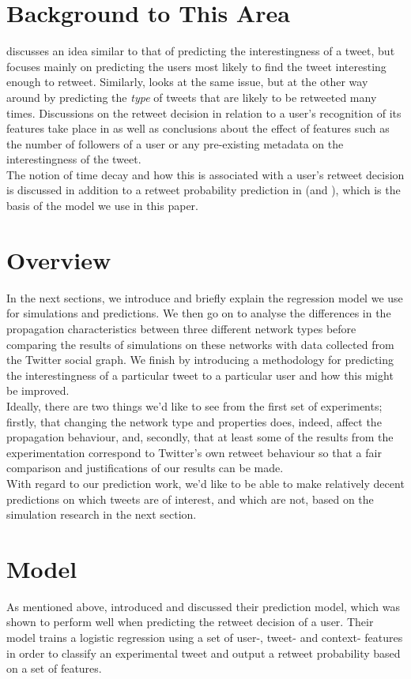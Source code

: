 \section{Background to This Area}
\cite{uysal11} discusses an idea similar to that of predicting the interestingness of a tweet, but focuses mainly on predicting the users most likely to find the tweet interesting enough to retweet. Similarly, \cite{hong11} looks at the same issue, but at the other way around by predicting the \textit{type} of tweets that are likely to be retweeted many times. Discussions on the retweet decision in relation to a user's recognition of its features take place in \cite{chorley12} as well as conclusions about the effect of features such as the number of followers of a user or any pre-existing metadata on the interestingness of the tweet.
\\
The notion of time decay and how this is associated with a user's retweet decision is discussed in addition to a retweet probability prediction in \cite{zhu11} (and \cite{peng11}), which is the basis of the model we use in this paper.

\section{Overview}
In the next sections, we introduce and briefly explain the regression model we use for simulations and predictions. We then go on to analyse the differences in the propagation characteristics between three different network types before comparing the results of simulations on these networks with data collected from the Twitter social graph. We finish by introducing a methodology for predicting the interestingness of a particular tweet to a particular user and how this might be improved.
\\
Ideally, there are two things we'd like to see from the first set of experiments; firstly, that changing the network type and properties does, indeed, affect the propagation behaviour, and, secondly, that at least some of the results from the experimentation correspond to Twitter's own retweet behaviour so that a fair comparison and justifications of our results can be made.
\\
With regard to our prediction work, we'd like to be able to make relatively decent predictions on which tweets are of interest, and which are not, based on the simulation research in the next section.

\section{Model} 
As mentioned above, \cite{zhu11} introduced and discussed their prediction model, which was shown to perform well when predicting the retweet decision of a user. Their model trains a logistic regression using a set of user-, tweet- and context- features in order to classify an experimental tweet and output a retweet probability based on a set of features.

